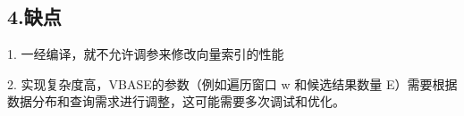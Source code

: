 \documentclass[12pt,UTF8,AutoFakeBold=2,a4paper]{ctexart} %
\newcommand{\sihao}{\fontsize{14pt}{\baselineskip}\selectfont}
\begin{document}
{\subsection{4.缺点}}
1. 一经编译，就不允许调参来修改向量索引的性能

2. 实现复杂度高，VBASE的参数（例如遍历窗口 w 和候选结果数量 E）需要根据数据分布和查询需求进行调整，这可能需要多次调试和优化。











\end{document}
